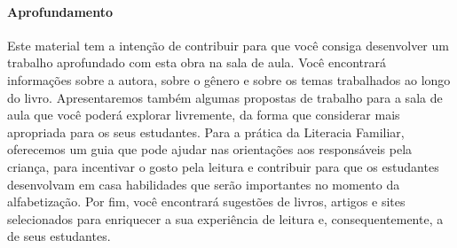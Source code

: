 \documentclass[11pt]{extarticle}
\begin{document}

\paragraph{Aprofundamento} Este material tem a 
intenção de contribuir para que você consiga desenvolver um trabalho aprofundado 
com esta obra na sala de aula. Você encontrará informações sobre a autora, sobre 
o gênero e sobre os temas trabalhados ao longo do livro. Apresentaremos também 
algumas propostas de trabalho para a sala de aula que você poderá explorar livremente, 
da forma que considerar mais apropriada para os seus estudantes. Para a prática 
da Literacia Familiar, oferecemos um guia que pode ajudar nas orientações aos 
responsáveis pela criança, para incentivar o gosto pela leitura e contribuir para 
que os estudantes desenvolvam em casa habilidades que serão importantes no momento 
da alfabetização. Por fim, você encontrará sugestões de livros, artigos e sites 
selecionados para enriquecer a sua experiência de leitura e, 
consequentemente, a de seus estudantes.
\end{document}
